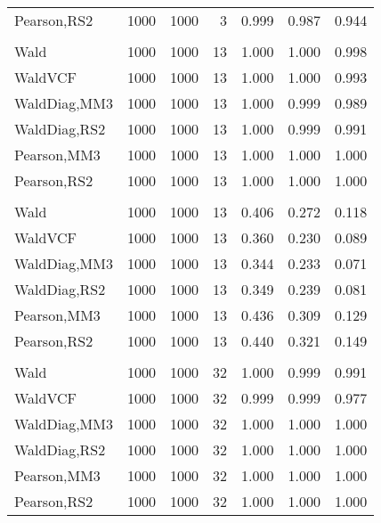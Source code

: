 \documentclass[
]{article}
\begin{document}
\begin{table}[H]
{\begin{tabular}[t]{lrrrrrr}
\hspace{1em}Pearson,RS2 & 1000 & 1000 & 3 & 0.999 & 0.987 & 0.944\\
\addlinespace[0.3em]
\multicolumn{7}{l}{\textbf{1F 15V}}\\
\hspace{1em}Wald & 1000 & 1000 & 13 & 1.000 & 1.000 & 0.998\\
\hspace{1em}WaldVCF & 1000 & 1000 & 13 & 1.000 & 1.000 & 0.993\\
\hspace{1em}WaldDiag,MM3 & 1000 & 1000 & 13 & 1.000 & 0.999 & 0.989\\
\hspace{1em}WaldDiag,RS2 & 1000 & 1000 & 13 & 1.000 & 0.999 & 0.991\\
\hspace{1em}Pearson,MM3 & 1000 & 1000 & 13 & 1.000 & 1.000 & 1.000\\
\hspace{1em}Pearson,RS2 & 1000 & 1000 & 13 & 1.000 & 1.000 & 1.000\\
\addlinespace[0.3em]
\multicolumn{7}{l}{\textbf{2F 10V}}\\
\hspace{1em}Wald & 1000 & 1000 & 13 & 0.406 & 0.272 & 0.118\\
\hspace{1em}WaldVCF & 1000 & 1000 & 13 & 0.360 & 0.230 & 0.089\\
\hspace{1em}WaldDiag,MM3 & 1000 & 1000 & 13 & 0.344 & 0.233 & 0.071\\
\hspace{1em}WaldDiag,RS2 & 1000 & 1000 & 13 & 0.349 & 0.239 & 0.081\\
\hspace{1em}Pearson,MM3 & 1000 & 1000 & 13 & 0.436 & 0.309 & 0.129\\
\hspace{1em}Pearson,RS2 & 1000 & 1000 & 13 & 0.440 & 0.321 & 0.149\\
\addlinespace[0.3em]
\multicolumn{7}{l}{\textbf{3F 15V}}\\
\hspace{1em}Wald & 1000 & 1000 & 32 & 1.000 & 0.999 & 0.991\\
\hspace{1em}WaldVCF & 1000 & 1000 & 32 & 0.999 & 0.999 & 0.977\\
\hspace{1em}WaldDiag,MM3 & 1000 & 1000 & 32 & 1.000 & 1.000 & 1.000\\
\hspace{1em}WaldDiag,RS2 & 1000 & 1000 & 32 & 1.000 & 1.000 & 1.000\\
\hspace{1em}Pearson,MM3 & 1000 & 1000 & 32 & 1.000 & 1.000 & 1.000\\
\hspace{1em}Pearson,RS2 & 1000 & 1000 & 32 & 1.000 & 1.000 & 1.000\\
\bottomrule
\end{tabular}}
\endgroup{}
\end{table}
\end{document}

